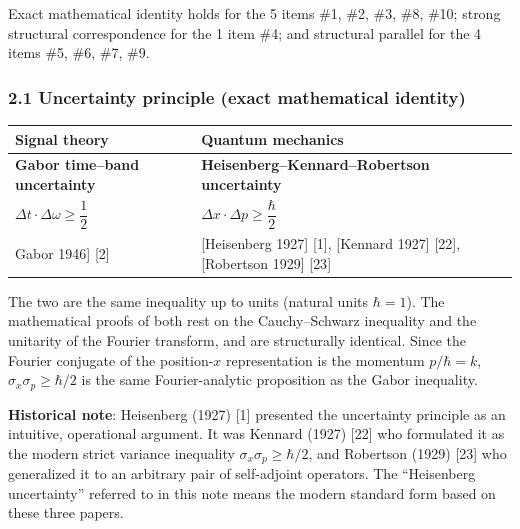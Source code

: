 \documentclass[
]{article}
\newcounter{none} %
\begin{document}
Exact mathematical identity holds for the 5 items \#1, \#2, \#3, \#8,
\#10; strong structural correspondence for the 1 item \#4; and
structural parallel for the 4 items \#5, \#6, \#7, \#9.

\subsubsection{2.1 Uncertainty principle (exact mathematical
identity)}\label{uncertainty-principle-exact-mathematical-identity}

{\def\LTcaptype{none} %
\begin{longtable}[]{@{}
  >{\raggedright\arraybackslash}p{}
  >{\raggedright\arraybackslash}p{}@{}}
\toprule\noalign{}
\begin{minipage}[b]{\linewidth}\raggedright
Signal theory
\end{minipage} & \begin{minipage}[b]{\linewidth}\raggedright
Quantum mechanics
\end{minipage} \\
\midrule\noalign{}
\endhead
\bottomrule\noalign{}
\endlastfoot
\textbf{Gabor time--band uncertainty} &
\textbf{Heisenberg--Kennard--Robertson uncertainty} \\
\(\Delta t \cdot \Delta \omega \geq \dfrac{1}{2}\) &
\(\Delta x \cdot \Delta p \geq \dfrac{\hbar}{2}\) \\
{[}Gabor 1946{]} {[}2{]} & {[}Heisenberg 1927{]} {[}1{]}, {[}Kennard
1927{]} {[}22{]}, {[}Robertson 1929{]} {[}23{]} \\
\end{longtable}
}

The two are the same inequality up to units (natural units \(\hbar=1\)).
The mathematical proofs of both rest on the Cauchy--Schwarz inequality
and the unitarity of the Fourier transform, and are structurally
identical. Since the Fourier conjugate of the position-\(x\)
representation is the momentum \(p/\hbar=k\),
\(\sigma_x\sigma_p\geq\hbar/2\) is the same Fourier-analytic proposition
as the Gabor inequality.

\textbf{Historical note}: Heisenberg (1927) {[}1{]} presented the
uncertainty principle as an intuitive, operational argument. It was
Kennard (1927) {[}22{]} who formulated it as the modern strict variance
inequality \(\sigma_x\sigma_p\geq\hbar/2\), and Robertson (1929)
{[}23{]} who generalized it to an arbitrary pair of self-adjoint
operators. The ``Heisenberg uncertainty'' referred to in this note means
the modern standard form based on these three papers.
\end{document}
